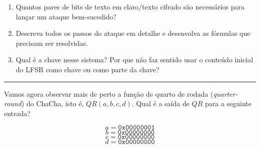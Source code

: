 \documentclass[12pt,a4paper]{article}
\newcommand{\exercicio}[1]{%
    \par\vspace{1.2em}
    \noindent
    {\color{black!55}\rule[-0.25em]{3pt}{1.6em}}%
    \hspace{0.6em}{\Large\bfseries Exerc\'{i}cio #1}
    \par\vspace{-0.4em}
    \noindent{\color{black!35}\rule{\textwidth}{0.4pt}}
    \par\vspace{0.35em}
}
\begin{document}
\begin{enumerate}[label=\arabic*.]
    \item Quantos pares de bits de texto em claro/texto cifrado são necessários para lançar um ataque bem-sucedido?
    \item Descreva todos os passos do ataque em detalhe e desenvolva as fórmulas que precisam ser resolvidas.
    \item Qual é a chave nesse sistema? Por que não faz sentido usar o conteúdo inicial do LFSR como chave ou como parte da chave?
\end{enumerate}

\exercicio{9}
Vamos agora observar mais de perto a função de quarto de rodada (\emph{quarter-round}) do ChaCha, isto é, $QR(a,b,c,d)$. Qual é a saída de $QR$ para a seguinte entrada?

\[
a = \texttt{0x00000001}
\]
\[
b = \texttt{0x00000000}
\]
\[
c = \texttt{0x00000000}
\]
\[
d = \texttt{0x00000000}
\]
\end{document}
